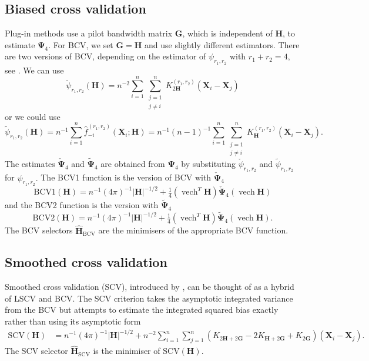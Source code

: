 \documentclass[a4paper,11pt]{article}
\renewcommand{\vec}[1]{\boldsymbol{#1}}
\newcommand{\mat}[1]{\mathbf{#1}}
\newcommand{\gmat}[1]{\boldsymbol{#1}}
\def\jneqi{\substack{j=1 \\ j\neq i}}
\def\Hmat{\mat{H}}
\def\G{\mat{G}}
\def\SCV{\mathrm{SCV}}
\def\BCV{\mathrm{BCV}}
\DeclareMathOperator{\VECH}{vech}
\begin{document}
\subsection{Biased cross validation}
Plug-in methods use a pilot bandwidth matrix $\G$, 
which is independent of $\Hmat$, to estimate $\gmat{\Psi}_4$.
For BCV, we set $\G = \Hmat$ and use slightly different estimators.    
There are two versions of BCV, depending on the 
estimator of $\psi_{r_1, r_2}$ with $r_1 + r_2 = 4,$  see \citet*{sain94}. 
We can use
\begin{equation}
\label{eq:leave-out1}
\check{\psi}_{r_1, r_2} (\Hmat) =
n^{-2} \sum_{i=1}^{n}\sum_{\jneqi}^{n} 
K^{(r_1, r_2)}_{2\Hmat} (\vec{X}_i - \vec{X}_j)
\end{equation}
or we could use 
\begin{equation}
\label{eq:leave-out2} \tilde{\psi}_{r_1, r_2} (\Hmat) = n^{-1}
\sum_{i=1}^n \hat{f}_{-i}^{(r_1, r_2)} (\vec{X}_i; \Hmat) =
n^{-1} (n-1)^{-1} \sum_{i=1}^{n}\sum_{\jneqi}^{n} 
K^{(r_1, r_2)}_{\Hmat} (\vec{X}_i - \vec{X}_j).
\end{equation}
The estimates $\check{\gmat{\Psi}}_4$ and
$\tilde{\gmat{\Psi}}_4$ are obtained from $\gmat{\Psi}_4$ by substituting
$\check{\psi}_{r_1, r_2}$ and $\tilde{\psi}_{r_1, r_2}$  for $\psi_{r_1, r_2}.$
The BCV1 function is the version of BCV with $\check{\gmat{\Psi}}_4$ 
\begin{equation}
\label{eq:bcv1}
\BCV 1 (\Hmat) = n^{-1} (4\pi)^{-1} |\Hmat|^{-1/2} + \tfrac{1}{4} (\VECH^T \Hmat)
\check{\gmat{\Psi}}_4  (\VECH \Hmat)
\end{equation}
and the BCV2 function is the version with $\tilde{\gmat{\Psi}}_4$ 
\begin{equation}
\label{eq:bcv2}
\BCV 2 (\Hmat) = n^{-1} (4\pi)^{-1} |\Hmat|^{-1/2} + \tfrac{1}{4} (\VECH^T \Hmat)
\tilde{\gmat{\Psi}}_4  (\VECH \Hmat).
\end{equation}
The BCV selectors $\hat{\Hmat}_\BCV$ are the minimisers of the appropriate 
BCV function.

\subsection{Smoothed cross validation}
\label{sec:scv}
Smoothed cross validation (SCV), introduced by \citet*{hall92}, 
can be thought of as a hybrid of LSCV and BCV.  The SCV 
criterion takes the asymptotic integrated variance from the BCV but attempts
to estimate the integrated squared bias exactly rather than using its asymptotic
form
\begin{align}
\label{eq:scv_norm}
\SCV (\Hmat) &=  n^{-1}(4\pi)^{-1} |\Hmat|^{-1/2} 
+ n^{-2} \sum_{i=1}^n
\sum_{j=1}^n (K_{2\Hmat + 2\G} - 2K_{\Hmat + 2\G} + K_{2\G})
(\vec{X}_i - \vec{X}_j). 
\end{align}
The SCV selector $\hat{\Hmat}_\SCV$ is the minimiser of $ \SCV(\Hmat).$
\end{document}
